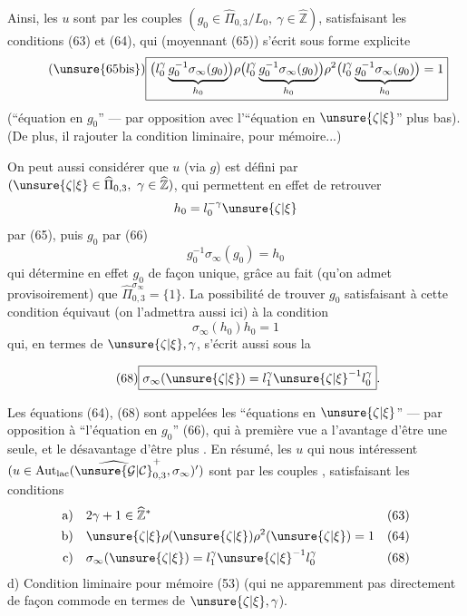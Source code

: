

Ainsi, les $u$ sont  par les couples
$(g_0\in\widehat{\Pi}_{0,3}/L_0,\ \gamma\in\widehat{\mathbb Z})$, satisfaisant les conditions
(63) et (64), qui (moyennant (65)) s'écrit sous forme explicite
\[
\tag{\unsure{65bis}}
\boxed{
\bigl(l_0^\gamma\underbrace{g_0^{-1}\sigma_\infty(g_0)}_{h_0}\bigr)
\rho\bigl(l_0^\gamma\underbrace{g_0^{-1}\sigma_\infty(g_0)}_{h_0}\bigr)
\rho^2\bigl(l_0^\gamma\underbrace{g_0^{-1}\sigma_\infty(g_0)}_{h_0}\bigr)=1
}
\]
(``équation en $g_0$'' --- par opposition avec l'``équation en $\unsure{\zeta|\xi}$'' plus bas).
(De plus, il  rajouter la condition liminaire, pour mémoire...)

On peut aussi considérer que  $u$ (via $g$) est défini par
$(\unsure{\zeta|\xi}\in\widehat{\Pi}_{0,3},\ \gamma\in\widehat{\mathbb Z})$, qui permettent en effet de retrouver
\[
h_0=l_0^{-\gamma}\unsure{\zeta|\xi}
\]
par (65), puis $g_0$ par (66)
\[
g_0^{-1}\sigma_\infty(g_0)=h_0
\]
qui détermine en effet $g_0$ de façon unique, grâce au fait (qu'on admet provisoirement)
que $\widehat{\Pi}_{0,3}^{\sigma_\infty}=\{1\}$.
La possibilité de trouver $g_0$ satisfaisant à cette condition équivaut (on l'admettra aussi ici) à la condition
\[
\tag{67}
\sigma_\infty(h_0)h_0=1
\]
qui, en termes de $\unsure{\zeta|\xi},\gamma$, s'écrit aussi sous la 


\[
\tag{68}
\boxed{\sigma_\infty(\unsure{\zeta|\xi})=l_1^\gamma\unsure{\zeta|\xi}^{-1}l_0^\gamma}.
\]

Les équations (64), (68) sont appelées les ``équations en $\unsure{\zeta|\xi}$'' --- par opposition à ``l'équation en $g_0$'' (66), qui à première vue a l'avantage d'être une seule, et le désavantage d'être plus .
En résumé, les $u$ qui nous intéressent
$(u\in\mathrm{Aut}_{\mathrm{lac}}(\widehat{\unsure{\mathcal{G}|\mathcal{C}}}_{0,3}^{+},\sigma_\infty)')$
sont  par les couples
\deleted{$\unsure{(\unsure{\zeta|\xi},\gamma)}$}, satisfaisant les conditions
\[
\begin{aligned}
\text{a)}\quad&2\gamma+1\in\widehat{\mathbb Z}^{*} &&(63)\\
\text{b)}\quad&\unsure{\zeta|\xi}\rho(\unsure{\zeta|\xi})\rho^2(\unsure{\zeta|\xi})=1 &&(64)\\
\text{c)}\quad&\sigma_\infty(\unsure{\zeta|\xi})=l_1^\gamma\unsure{\zeta|\xi}^{-1}l_0^\gamma &&(68)
\end{aligned}
\]
d) Condition liminaire pour mémoire (53)
(qui ne  apparemment pas directement de façon commode en termes de $\unsure{\zeta|\xi},\gamma$).

